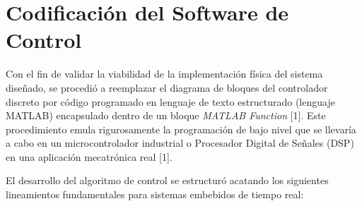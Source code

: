 \documentclass[12pt, a4paper,journal, onecolumn, compsoc]{IEEEtran}
\begin{document}
\section{Codificación del Software de Control}

Con el fin de validar la viabilidad de la implementación física del sistema diseñado, se procedió a reemplazar el diagrama de bloques del controlador discreto por código programado en lenguaje de texto estructurado (lenguaje MATLAB) encapsulado dentro de un bloque \textit{MATLAB Function} [1]. Este procedimiento emula rigurosamente la programación de bajo nivel que se llevaría a cabo en un microcontrolador industrial o Procesador Digital de Señales (DSP) en una aplicación mecatrónica real [1].

El desarrollo del algoritmo de control se estructuró acatando los siguientes lineamientos fundamentales para sistemas embebidos de tiempo real:
\end{document}
